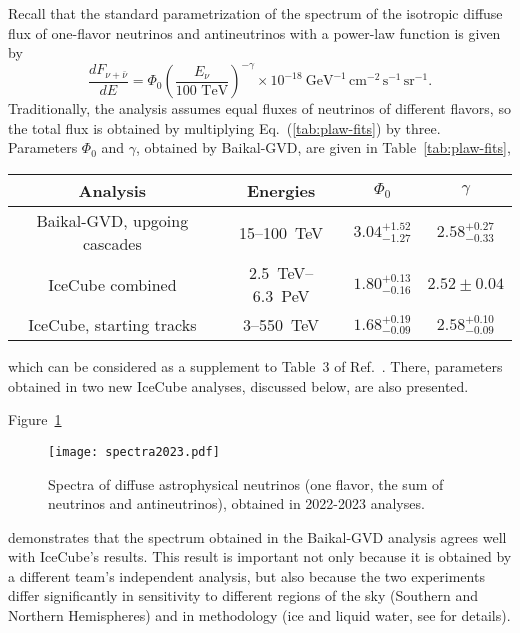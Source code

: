 \documentclass[a4paper,noshowpacs,noshowkeys,floatfix,twocolumn,preprintnumbers,nofootinbib]{revtex4-2}
\begin{document}
Recall that the standard parametrization of the spectrum of the isotropic diffuse flux of one-flavor neutrinos and antineutrinos with a power-law function is given by 
\begin{equation}
\frac{dF_{\nu+\bar\nu}}{dE} = \Phi_{0}
\left(\frac{E_{\nu}}{\mbox{100~TeV}} \right)^{-\gamma}
\!\!\!
\times 10^{-18}~\mbox{GeV}^{-1}\,\mbox{cm}^{-2}\,\mbox{s}^{-1}\,
\mbox{sr}^{-1}.
\label{Eq:plaw}
\end{equation}
Traditionally, the analysis assumes equal fluxes of neutrinos of different flavors, so the total flux is obtained by multiplying Eq.~(\ref{tab:plaw-fits}) by three.  Parameters $\Phi_{0}$ and $\gamma$, obtained by Baikal-GVD, are given in
Table~\ref{tab:plaw-fits},
\begin{table*}
\begin{center}
\begin{tabular}{cccc}
\hline
\hline
Analysis & Energies & $\Phi_{0}$ & $\gamma$ \\
\hline
Baikal-GVD, upgoing cascades \cite{Baikal-diffusePRD}& 15--100~TeV &
$3.04^{+1.52}_{-1.27}$ & $2.58^{+0.27}_{-0.33}$ \\
IceCube combined \cite{IceCube-ICRC2023-combined}&
2.5~TeV--6.3~PeV& $1.80^{+0.13}_{-0.16}$ & $2.52\pm0.04$ \\
IceCube, starting tracks \cite{IceCube-ICRC2023-starting}&
3--550~TeV& $1.68^{+0.19}_{-0.09}$ & $2.58^{+0.10}_{-0.09}$ \\
\hline
\hline
\end{tabular}
\end{center}
\caption{\label{tab:plaw-fits}
Parameters of power-law fits (\ref{Eq:plaw}) of 
the diffuse astrophysical neutrino spectrum from the 2022-2023 analyses. }
\end{table*}
which can be considered as a supplement to Table~3 of Ref.~\cite{ST-UFN}. There, parameters obtained in two new IceCube analyses, discussed below, are also presented.

Figure~\ref{fig:diff-fluxes}
\begin{figure}
\centerline{\texttt{[image: spectra2023.pdf]}}
\caption{\label{fig:diff-fluxes}
Spectra of diffuse astrophysical neutrinos (one flavor, the sum of neutrinos and antineutrinos), obtained in 2022-2023 analyses.}
\end{figure}
demonstrates that the spectrum obtained in the Baikal-GVD analysis agrees well with IceCube's results. This result is important not only because it is obtained by a different team's independent analysis, but also because the two experiments differ significantly in sensitivity to different regions of the sky (Southern and Northern Hemispheres) and in methodology (ice and liquid water, see \cite{ST-UFN} for details).
\end{document}
